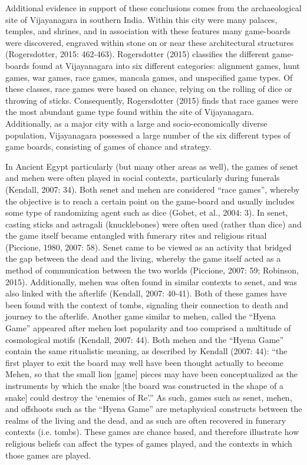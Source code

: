 \documentclass[%
	]{ijsra}
\begin{document}
Additional evidence in support of these conclusions comes from the archaeological site of Vijayanagara in southern India. Within this city were many palaces, temples, and shrines, and in association with these features many game-boards were discovered, engraved within stone on or near these architectural structures (Rogersdotter, 2015: 462-463). Rogersdotter (2015) classifies the different game-boards found at Vijayanagara into six different categories: alignment games, hunt games, war games, race games, mancala games, and unspecified game types. Of these classes, race games were based on chance, relying on the rolling of dice or throwing of sticks. Consequently, Rogersdotter (2015) finds that race games were the most abundant game type found within the site of Vijayanagara. Additionally, as a major city with a large and socio-economically diverse population, Vijayanagara possessed a large number of the six different types of game boards, consisting of games of chance and strategy. 

In Ancient Egypt particularly (but many other areas as well), the games of senet and mehen were often played in social contexts, particularly during funerals (Kendall, 2007: 34). Both senet and mehen are considered “race games”, whereby the objective is to reach a certain point on the game-board and usually includes some type of randomizing agent such as dice (Gobet, et al., 2004: 3). In senet, casting sticks and astragali (knucklebones) were often used (rather than dice) and the game itself became entangled with funerary rites and religious ritual (Piccione, 1980, 2007: 58). Senet came to be viewed as an activity that bridged the gap between the dead and the living, whereby the game itself acted as a method of communication between the two worlds (Piccione, 2007: 59; Robinson, 2015). Additionally, mehen was often found in similar contexts to senet, and was also linked with the afterlife (Kendall, 2007: 40-41). Both of these games have been found with the context of tombs, signaling their connection to death and journey to the afterlife. Another game similar to mehen, called the “Hyena Game” appeared after mehen lost popularity and too comprised a multitude of cosmological motifs (Kendall, 2007: 44). Both mehen and the “Hyena Game” contain the same ritualistic meaning, as described by Kendall (2007: 44): “the first player to exit the board may well have been thought actually to become Mehen, so that the small lion [game] pieces may have been conceptualized as the instruments by which the snake [the board was constructed in the shape of a snake] could destroy the ‘enemies of Re’.” As such, games such as senet, mehen, and offshoots such as the “Hyena Game” are metaphysical constructs between the realms of the living and the dead, and as such are often recovered in funerary contexts (i.e. tombs). These games are chance based, and therefore illustrate how religious beliefs can affect the types of games played, and the contexts in which those games are played. 
\end{document}
